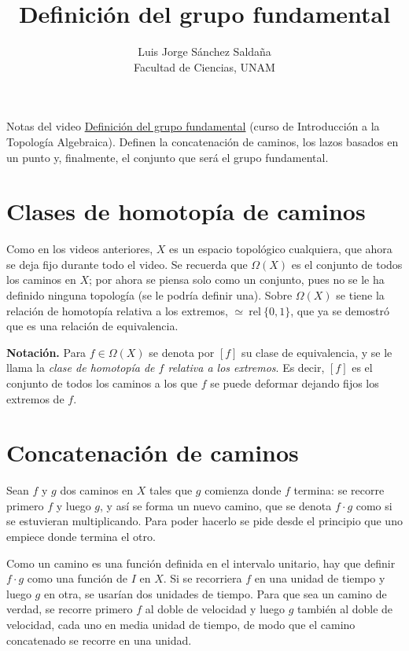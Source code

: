 \documentclass[11pt]{article}
\title{Definición del grupo fundamental}
\author{Luis Jorge Sánchez Saldaña\\[2pt]\small Facultad de Ciencias, UNAM}
\date{}
\begin{document}
\maketitle

\noindent\small Notas del video
\href{https://www.youtube.com/watch?v=fTB5eN1axOI}{\guillemotleft{}Definición del grupo fundamental\guillemotright{}}
(curso de Introducción a la Topología Algebraica). Definen la concatenación de caminos, los lazos basados en un punto y, finalmente, el conjunto que será el grupo fundamental.
\normalsize

\section*{Clases de homotopía de caminos}

Como en los videos anteriores, $X$ es un espacio topológico cualquiera, que ahora se deja fijo durante todo el video. Se recuerda que $\Omega(X)$ es el conjunto de todos los caminos en $X$; por ahora se piensa solo como un conjunto, pues no se le ha definido ninguna topología (se le podría definir una). Sobre $\Omega(X)$ se tiene la relación de homotopía relativa a los extremos, $\simeq\ \mathrm{rel}\ \{0,1\}$, que ya se demostró que es una relación de equivalencia.

\medskip\noindent\textbf{Notación.} Para $f\in\Omega(X)$ se denota por $[f]$ su clase de equivalencia, y se le llama la \emph{clase de homotopía de $f$ relativa a los extremos}. Es decir, $[f]$ es el conjunto de todos los caminos a los que $f$ se puede deformar dejando fijos los extremos de $f$.

\section*{Concatenación de caminos}

Sean $f$ y $g$ dos caminos en $X$ tales que $g$ comienza donde $f$ termina: se recorre primero $f$ y luego $g$, y así se forma un nuevo camino, que se denota $f\cdot g$ como si se estuvieran multiplicando. Para poder hacerlo se pide desde el principio que uno empiece donde termina el otro.

Como un camino es una función definida en el intervalo unitario, hay que definir $f\cdot g$ como una función de $I$ en $X$. Si se recorriera $f$ en una unidad de tiempo y luego $g$ en otra, se usarían dos unidades de tiempo. Para que sea un camino de verdad, se recorre primero $f$ al doble de velocidad y luego $g$ también al doble de velocidad, cada uno en media unidad de tiempo, de modo que el camino concatenado se recorre en una unidad.
\end{document}
